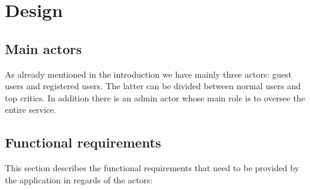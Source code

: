 %
%

\chapter{Design}
\justifying
\section{Main actors}
As already mentioned in the introduction we have mainly three actors: guest users and registered users. The latter can be divided between normal users and top critics. In addition there is an admin actor whose main role is to oversee the entire service.

\section{Functional requirements}
This section describes the functional requirements that need to be provided by the application in regards of the actors:
